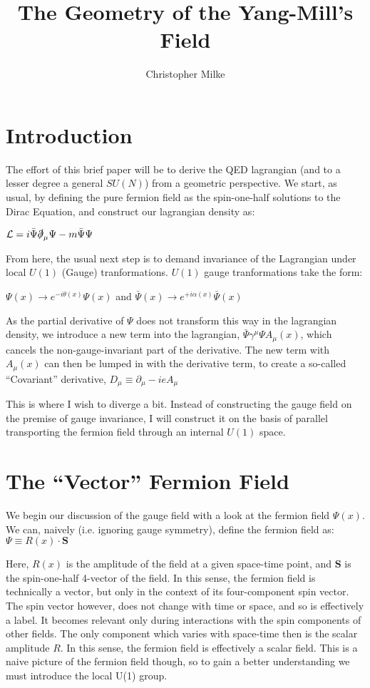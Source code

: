 \documentclass{article}
\begin{document}
\title{The Geometry of the Yang-Mill's Field}
\author{Christopher Milke}

\maketitle

\section{Introduction}
        The effort of this brief paper will be to derive the QED lagrangian (and to a lesser degree a general $SU(N)$) from a geometric perspective. We start, as usual, by defining the pure fermion field as the spin-one-half solutions to the Dirac Equation, and construct our lagrangian density as:

        $ \mathcal{L} =  i \bar{\Psi} \slashed\partial_\mu \Psi - m \bar{\Psi} \Psi   $

        From here, the usual next step is to demand invariance of the Lagrangian under local $U(1)$ (Gauge) tranformations. $U(1)$ gauge tranformations take the form: 

        $ \Psi(x) \rightarrow e^{-i \theta(x)} \Psi(x) $ and $ \bar\Psi(x) \rightarrow e^{+i \alpha(x)} \bar\Psi(x) $

        As the partial derivative of $\Psi$ does not transform this way in the lagrangian density, we introduce a new term into the lagrangian, 
        $  \bar{\Psi} \gamma^\mu \Psi A_\mu(x) $, which cancels the non-gauge-invariant part of the derivative. The new term with $A_\mu(x)$ can then be lumped in with the derivative term, to create a so-called ``Covariant'' derivative,
        $ D_\mu \equiv \partial_\mu - i e A_\mu $

        This is where I wish to diverge a bit. Instead of constructing the gauge field on the premise of gauge invariance, I will construct it on the basis of parallel transporting the fermion field through an internal $U(1)$ space.


\section{The ``Vector'' Fermion Field}
        We begin our discussion of the gauge field with a look at the fermion field $\Psi(x)$. We can, naively (i.e. ignoring gauge symmetry), define the fermion field as: 
        $\Psi \equiv R(x) \cdot \mathbf{S}$

        Here, $R(x)$ is the amplitude of the field at a given space-time point, and $\mathbf{S}$ is the spin-one-half 4-vector of the field.
        In this sense, the fermion field is technically a vector, but only in the context of its four-component spin vector. The spin vector however, does not change with time or space, and so is effectively a label. It becomes relevant only during interactions with the spin components of other fields. The only component which varies with space-time then is the scalar amplitude $R$. In this sense, the fermion field is effectively a scalar field. This is a naive picture of the fermion field though, so to gain a better understanding we must introduce the local U(1) group.
        
\end{document}
